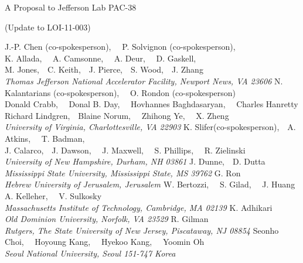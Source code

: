 \begin{center}
A Proposal to Jefferson Lab PAC-38

(Update to LOI-11-003)

\vspace{1.5cm}

\setcounter{footnote}{1}
%
{\n J.-P. Chen (co-spokesperson),~~ P. Solvignon (co-spokesperson),\\
K. Allada,~~ A. Camsonne,~~ A. Deur,~~ D. Gaskell,\\
M. Jones,~~C. Keith,~~J. Pierce,~~S. Wood,~~J. Zhang}\\
\ls
{\normalsize\it{Thomas Jefferson National Accelerator Facility, Newport News, VA 23606}}
\ks
%
%
{\n N. Kalantarians (co-spokesperson),~~ O. Rondon (co-spokesperson)\\
Donald  Crabb,~~ Donal B. Day,~~ Hovhannes Baghdasaryan,~~ Charles Hanretty\\
Richard Lindgren,~~Blaine Norum,~~ Zhihong Ye,~~ X. Zheng}\\
\ls
{\normalsize\it{University of Virginia, Charlottesville, VA 22903}}
\ks
%
%
{\n K. Slifer\footnotemark (co-spokesperson),~~A. Atkins,~~ T. Badman,\\
J. Calarco,~~J. Dawson,~~ J. Maxwell,~~ S. Phillips,~~ R. Zielinski}\\
\ls
{\normalsize\it{University of New Hampshire, Durham, NH 03861}}
\ks
%
%
{\n J. Dunne,~~D. Dutta} \\
\ls
{\normalsize\it{Mississippi State University, %
Mississippi State, MS 39762}}
\ks
{\n G. Ron} \\
\ls
{\normalsize\it{Hebrew University of Jerusalem, Jerusalem
}}
\ks
%
{\n W. Bertozzi,~~ S. Gilad, ~~J. Huang\\
A. Kelleher,~~ V. Sulkosky} \\
\ls
{\normalsize\it{Massachusetts Institute of Technology, Cambridge, MA 02139
}}
\ks
%
%
{\n K. Adhikari} \\
\ls
{\normalsize\it{Old Dominion University, Norfolk, VA 23529}}
\ks
{\n R. Gilman} \\
\ls
{\normalsize\it{ Rutgers, The State University of New Jersey, Piscataway, NJ 08854}}
\ks
%
{\n Seonho Choi,~~ Hoyoung Kang,~~ Hyekoo Kang,~~ Yoomin Oh} \\
\ls
{\normalsize\it{ Seoul National University, Seoul 151-747 Korea}}
\ks
%

\end{center}
